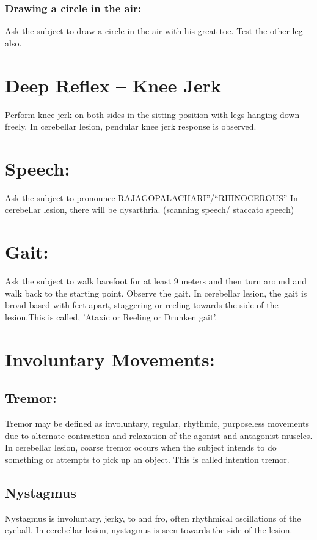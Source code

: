 \documentclass[a4paper,12pt]{book}
\begin{document}
\subsubsection*{Drawing a circle in the air:}
				Ask the subject to draw a circle in the air with his great toe. Test the other leg  also.
				\section*{Deep Reflex – Knee Jerk}
					Perform knee jerk on both sides in the sitting position with legs hanging down freely.
						In cerebellar lesion, pendular knee jerk response is observed.

						\section*{Speech:}
						Ask the subject to pronounce RAJAGOPALACHARI”/“RHINOCEROUS”
							In cerebellar lesion, there will be dysarthria. (scanning speech/ staccato speech)
							\section*{Gait:}
								Ask the subject to walk barefoot for at least 9 meters and then turn around and walk back to the starting point. Observe the gait.
									In cerebellar lesion, the gait is broad based with feet apart, staggering or reeling towards the side of the lesion.This is called, 'Ataxic or Reeling or Drunken gait'.
								\section*{Involuntary Movements:} 
								\subsection*{Tremor:}
										Tremor may be defined as involuntary, regular, rhythmic, purposeless movements due to alternate contraction and relaxation of the agonist and antagonist muscles.
											In cerebellar lesion, coarse tremor occurs when the subject intends to do something or attempts to pick up an object. This is called intention tremor.
											\subsection*{Nystagmus}
											Nystagmus is involuntary, jerky, to and fro, often rhythmical oscillations of the eyeball. In cerebellar lesion, nystagmus is seen towards the side of the lesion.
\end{document}
